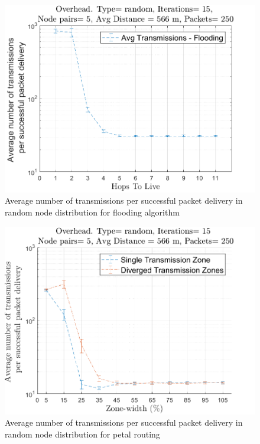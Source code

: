 \begin{figure}[hbtp]
\centering
\includegraphics[width=\simResultFigSize\textwidth,height=\textheight,keepaspectratio]{ncsuthesis-0.6/Chapter-5/figs/fl_trans_random.png}
\caption{Average number of transmissions per successful packet delivery in random node distribution for flooding algorithm}
\label{fig:fl_trans_random}
\end{figure}

\begin{figure}[hbtp]
\centering
\includegraphics[width=\simResultFigSize\textwidth,height=\textheight,keepaspectratio]{ncsuthesis-0.6/Chapter-5/figs/pe_trans_random.png}
\caption{Average number of transmissions per successful packet delivery in random node distribution for petal routing}
\label{fig:pe_trans_random}
\end{figure}

